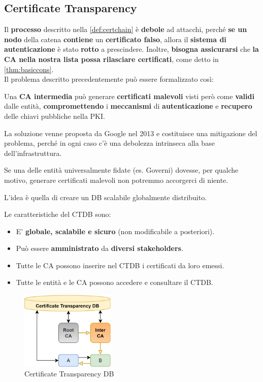 \subsection{Certificate Transparency}
Il \textbf{processo} descritto nella \cref{def:certchain} è \textbf{debole} ad attacchi, perché \textbf{se un nodo} della catena \textbf{contiene} un \textbf{certificato falso}, allora il \textbf{sistema di autenticazione} è stato \textbf{rotto} a prescindere. Inoltre, \textbf{bisogna assicurarsi} che \textbf{la CA nella nostra lista possa rilasciare certificati}, come detto in \cref{thm:basiccons}.\\
Il problema descritto precedentemente può essere formalizzato così:
\begin{definition}
Una \textbf{CA intermedia} può generare \textbf{certificati malevoli} visti però come \textbf{validi} dalle entità, \textbf{compromettendo} i \textbf{meccanismi} di \textbf{autenticazione} e \textbf{recupero} delle chiavi pubbliche nella PKI.
\end{definition}
La soluzione venne proposta da Google nel 2013 e costituisce una mitigazione del problema, perché in ogni caso c'è una debolezza intrinseca alla base dell'infrastruttura.
\begin{note}
Se una delle entità universalmente fidate (es. Governi) dovesse, per qualche motivo, generare certificati malevoli non potremmo accorgerci di niente.
\end{note}
L'idea è quella di creare un DB scalabile globalmente distribuito.\pagebreak
\begin{multicols}{2}
\begin{definition}[CTDB]
Le caratteristiche del CTDB sono:
\begin{itemize}
    \item E' \textbf{globale, scalabile e sicuro} (non modificabile a posteriori).
    \item Può essere \textbf{amministrato} da \textbf{diversi stakeholders}.
    \item Tutte le CA possono inserire nel CTDB i certificati da loro emessi.
    \item Tutte le entità e le CA possono accedere e consultare il CTDB.
\end{itemize}
\end{definition}

\columnbreak
\begin{figure}[H]
    \centering
    \includegraphics[width=0.4\textwidth]{image/certtrans.png}
    \caption{Certificate Transparency DB}
    \label{fig:certrans}
\end{figure}
\end{multicols}


